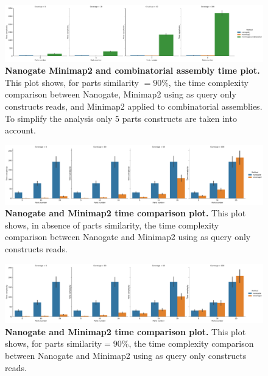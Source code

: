 \documentclass[11pt, a4paper]{article}
\begin{document}
 \begin{figure}[ht]
    \begin{center}
    \includegraphics[width=1.35\textwidth]{../results/images_notebook/v_400/sim_09_5_parts_time_comparison.pdf}
    \end{center}
    \caption{{\bf Nanogate Minimap2 and combinatorial assembly time plot.} This plot shows, for parts similarity $=90\%$, the time complexity comparison between Nanogate, Minimap2 using as query only constructs reads, and Minimap2 applied to combinatorial assemblies. To simplify the analysis only 5 parts constructs are taken into account.}
   \label{fig:v_400_sim_09_5_parts_time_comparison}
\end{figure}



 \begin{figure}[ht]
    \begin{center}
    \includegraphics[width=1.35\textwidth]{../results/images_notebook/v_400/sim_00_minimap2_nanogate_time_comparison.pdf}
    \end{center}
    \caption{{\bf Nanogate and Minimap2 time comparison plot.} This plot shows, in absence of parts similarity, the time complexity comparison between Nanogate and Minimap2 using as query only constructs reads.}
   \label{fig:v_400_sim_00_time_comparison}
\end{figure}


 \begin{figure}[ht]
    \begin{center}
    \includegraphics[width=1.35\textwidth]{../results/images_notebook/v_400/sim_09_minimap2_nanogate_time_comparison.pdf}
    \end{center}
    \caption{{\bf Nanogate and Minimap2 time comparison plot.} This plot shows, for parts similarity$=90\%$, the time complexity comparison between Nanogate and Minimap2 using as query only constructs reads.}
   \label{fig:v_400_sim_09_time_comparison}
\end{figure}
 
\end{document}
